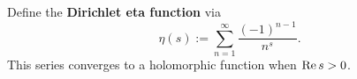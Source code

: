 \documentclass{homework}
\begin{document}
                                                                                                                                      \begin{problem} %
                                                                                                                                        Define the \textbf{Dirichlet eta function} via
                                                                                                                                          \[
                                                                                                                                              \eta(s) := \sum_{n=1}^\infty \frac{(-1)^{n-1}}{n^s}.
                                                                                                                                                \]
                                                                                                                                                  This series converges to a holomorphic function when $\operatorname{Re} s > 0$.
                                                                                                                                                  \end{problem}
\end{document}
